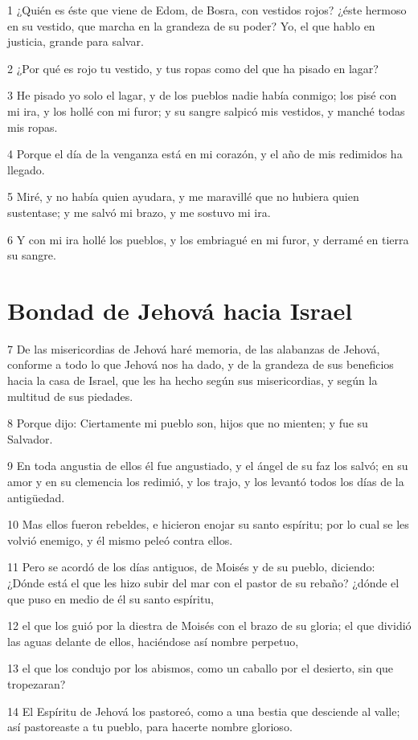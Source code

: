 \par 1 ¿Quién es éste que viene de Edom, de Bosra, con vestidos rojos? ¿éste hermoso en su vestido, que marcha en la grandeza de su poder? Yo, el que hablo en justicia, grande para salvar.
\par 2 ¿Por qué es rojo tu vestido, y tus ropas como del que ha pisado en lagar?
\par 3 He pisado yo solo el lagar, y de los pueblos nadie había conmigo; los pisé con mi ira, y los hollé con mi furor; y su sangre salpicó mis vestidos, y manché todas mis ropas. 
\par 4 Porque el día de la venganza está en mi corazón, y el año de mis redimidos ha llegado.
\par 5 Miré, y no había quien ayudara, y me maravillé que no hubiera quien sustentase; y me salvó mi brazo, y me sostuvo mi ira. 
\par 6 Y con mi ira hollé los pueblos, y los embriagué en mi furor, y derramé en tierra su sangre.

\section*{Bondad de Jehová hacia Israel}

\par 7 De las misericordias de Jehová haré memoria, de las alabanzas de Jehová, conforme a todo lo que Jehová nos ha dado, y de la grandeza de sus beneficios hacia la casa de Israel, que les ha hecho según sus misericordias, y según la multitud de sus piedades.
\par 8 Porque dijo: Ciertamente mi pueblo son, hijos que no mienten; y fue su Salvador.
\par 9 En toda angustia de ellos él fue angustiado, y el ángel de su faz los salvó; en su amor y en su clemencia los redimió, y los trajo, y los levantó todos los días de la antigüedad.
\par 10 Mas ellos fueron rebeldes, e hicieron enojar su santo espíritu; por lo cual se les volvió enemigo, y él mismo peleó contra ellos.
\par 11 Pero se acordó de los días antiguos, de Moisés y de su pueblo, diciendo: ¿Dónde está el que les hizo subir del mar con el pastor de su rebaño? ¿dónde el que puso en medio de él su santo espíritu,
\par 12 el que los guió por la diestra de Moisés con el brazo de su gloria; el que dividió las aguas delante de ellos, haciéndose así nombre perpetuo,
\par 13 el que los condujo por los abismos, como un caballo por el desierto, sin que tropezaran?
\par 14 El Espíritu de Jehová los pastoreó, como a una bestia que desciende al valle; así pastoreaste a tu pueblo, para hacerte nombre glorioso.

